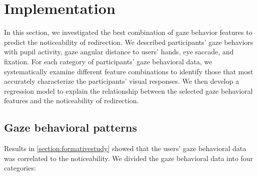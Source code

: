 \section{Implementation}
\label{section:implementation}

In this section, we investigated the best combination of gaze behavior features to predict the noticeability of redirection.
We described participants' gaze behaviors with pupil activity, gaze angular distance to users' hands, eye saccade, and fixation.
For each category of participants' gaze behavioral data, we systematically examine different feature combinations to identify those that most accurately characterize the participants' visual responses.
We then develop a regression model to explain the relationship between the selected gaze behavioral features and the noticeability of redirection.


\subsection{Gaze behavioral patterns}
\label{section:featureselection}

Results in \autoref{section:formativestudy} showed that the users' gaze behavioral data was correlated to the noticeability.
We divided the gaze behavioral data into four categories:

